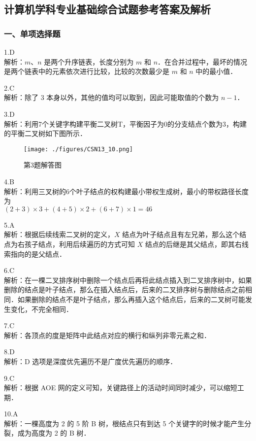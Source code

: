 \subsection{计算机学科专业基础综合试题参考答案及解析}
\subsubsection{一、单项选择题}
1.D \\
解析：$m$、$n$ 是两个升序链表，长度分别为 $m$ 和 $n$．在合并过程中，最坏的情况是两个链表中的元素依次进行比较，比较的次数最少是 $m$ 和 $n$ 中的最小值．

2.C \\
解析：除了 $3$ 本身以外，其他的值均可以取到，因此可能取值的个数为 $n-1$． 

3.D \\
解析：利用7个关键字构建平衡二叉树T，平衡因子为0的分支结点个数为3，构建的平衡二叉树如下图所示．
\begin{figure}[ht]
\centering
\texttt{[image: ./figures/CSN13\_10.png]}
\caption{第3题解答图} \label{CSN13_fig10}
\end{figure}

4.B \\
解析：利用三叉树的6个叶子结点的权构建最小带权生成树，最小的带权路径长度为 \\
$(2+3) \times 3 + (4+5) \times 2 + (6+7) \times 1 = 46$

5.A \\
解析：根据后续线索二叉树的定义，$X$ 结点为叶子结点且有左兄弟，那么这个结点为右孩子结点，利用后续遍历的方式可知 $X$ 结点的后继是其父结点，即其右线索指向的是父结点．

6.C \\
解析：在一棵二叉排序树中删除一个结点后再将此结点插入到二叉排序树中，如果删除的结点是叶子结点，那么在插入结点后，后来的二叉排序树与删除结点之前相同．如果删除的结点不是叶子结点，那么再插入这个结点后，后来的二叉树可能发生变化，不完全相同．

7.C \\
解析：各顶点的度是矩阵中此结点对应的横行和纵列非零元素之和． 

8.D \\
解析：D 选项是深度优先遍历不是广度优先遍历的顺序．

9.C \\
解析：根据 AOE 网的定义可知，关键路径上的活动时间同时减少，可以缩短工期． 

10.A \\
解析：一棵高度为 2 的 5 阶 B 树，根结点只有到达 5 个关键字的时候才能产生分裂，成为高度为 2 的 B 树． 


